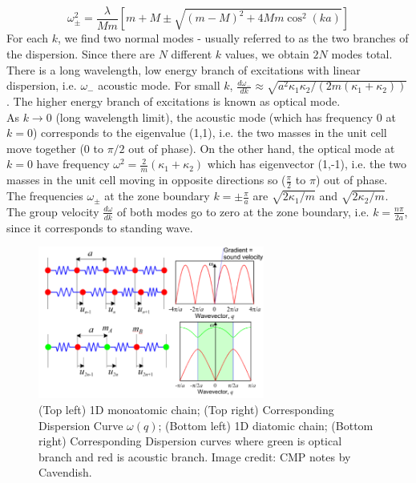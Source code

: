 \documentclass[a4paper]{article}
\begin{document}
\begin{Note}
$$\omega_\pm^2=\frac{\lambda}{Mm}[m+M\pm\sqrt{(m-M)^2+4Mm\cos^2(ka)}]$$
For each $k$, we find two normal modes - usually referred to as the two branches of the dispersion. Since there are $N$ different $k$ values, we obtain $2N$ modes total. There is a long wavelength, low energy branch of excitations with linear dispersion, i.e. $\omega_-$ acoustic mode. For small $k$, $\frac{d\omega_-}{dk}\approx\sqrt{a^2\kappa_1\kappa_2/(2m(\kappa_1+\kappa_2))}$. The higher energy branch of excitations is known as optical mode.\\[5pt]
As $k\rightarrow 0$ (long wavelength limit), the acoustic mode (which has frequency 0 at $k=0$) corresponds to the eigenvalue (1,1), i.e. the two masses in the unit cell move together (0 to $\pi/2$ out of phase). On the other hand, the optical mode at $k=0$ have frequency $\omega^2=\frac{2}{m}(\kappa_1+\kappa_2)$ which has eigenvector (1,-1), i.e. the two masses in the unit cell moving in opposite directions so ($\frac{\pi}{2}$ to $\pi$) out of phase.\\[5pt]
The frequencies $\omega_{\pm}$ at the zone boundary $k=\pm\frac{\pi}{a}$ are $\sqrt{2\kappa_1/m}$ and $\sqrt{2\kappa_2/m}$. The group velocity $\frac{d\omega}{dk}$ of both modes go to zero at the zone boundary, i.e. $k=\frac{n\pi}{2a}$, since it corresponds to standing wave.
\end{Note}
\begin{figure}[H]
    \centering
    \includegraphics[width=\linewidth,height=5cm]{phonondispersion.PNG}
    \caption{(Top left) 1D monoatomic chain; (Top right) Corresponding Dispersion Curve $\omega(q)$; (Bottom left) 1D diatomic chain; (Bottom right) Corresponding Dispersion curves where green is optical branch and red is acoustic branch. Image credit: CMP notes by Cavendish.}
\end{figure}
\end{document}
